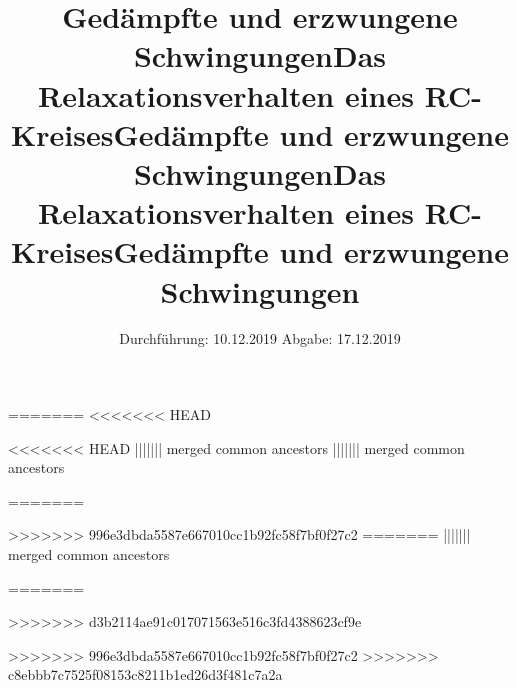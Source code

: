 

\subject{Versuch 354}
=======
<<<<<<< HEAD
\subject{Versuch 354}
\title{Gedämpfte und erzwungene Schwingungen}
<<<<<<< HEAD
||||||| merged common ancestors
||||||| merged common ancestors
\subject{Versuch 353}
\title{Das Relaxationsverhalten eines RC-Kreises}
=======
\subject{Versuch 353}
\title{Gedämpfte und erzwungene Schwingungen}
>>>>>>> 996e3dbda5587e667010cc1b92fc58f7bf0f27c2
=======
||||||| merged common ancestors
\subject{Versuch 353}
\title{Das Relaxationsverhalten eines RC-Kreises}
=======
\subject{Versuch 353}
>>>>>>> d3b2114ae91c017071563e516c3fd4388623cf9e
\title{Gedämpfte und erzwungene Schwingungen}
>>>>>>> 996e3dbda5587e667010cc1b92fc58f7bf0f27c2
>>>>>>> c8ebbb7c7525f08153c8211b1ed26d3f481c7a2a
\date{%
  Durchführung: 10.12.2019
  \hspace{3em}
  Abgabe: 17.12.2019
}



\maketitle
\thispagestyle{empty}
\tableofcontents
\newpage






\nocite{*}
\printbibliography{}


